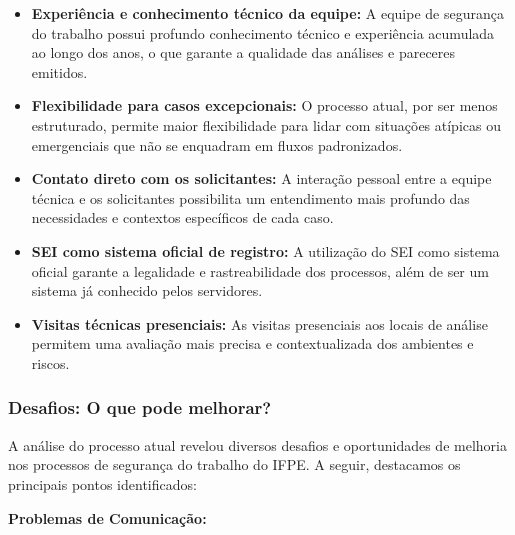 \documentclass[12pt,a4paper]{article}
\begin{document}
\begin{itemize}
    \item \textbf{Experiência e conhecimento técnico da equipe:} A equipe de segurança do trabalho possui profundo conhecimento técnico e experiência acumulada ao longo dos anos, o que garante a qualidade das análises e pareceres emitidos.
    
    \item \textbf{Flexibilidade para casos excepcionais:} O processo atual, por ser menos estruturado, permite maior flexibilidade para lidar com situações atípicas ou emergenciais que não se enquadram em fluxos padronizados.
    
    \item \textbf{Contato direto com os solicitantes:} A interação pessoal entre a equipe técnica e os solicitantes possibilita um entendimento mais profundo das necessidades e contextos específicos de cada caso.
    
    \item \textbf{SEI como sistema oficial de registro:} A utilização do SEI como sistema oficial garante a legalidade e rastreabilidade dos processos, além de ser um sistema já conhecido pelos servidores.
    
    \item \textbf{Visitas técnicas presenciais:} As visitas presenciais aos locais de análise permitem uma avaliação mais precisa e contextualizada dos ambientes e riscos.
\end{itemize}

\subsubsection{Desafios: O que pode melhorar?}
A análise do processo atual revelou diversos desafios e oportunidades de melhoria nos processos de segurança do trabalho do IFPE. A seguir, destacamos os principais pontos identificados:

\textbf{Problemas de Comunicação:}
\end{document}
